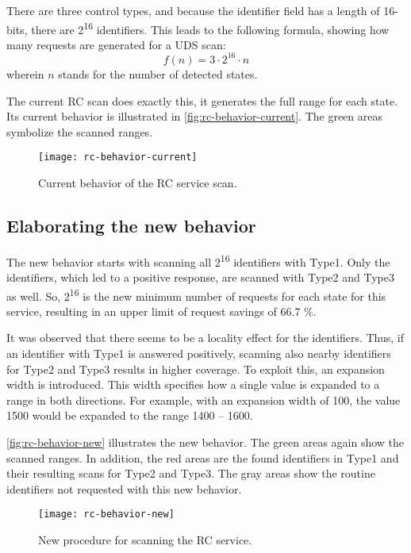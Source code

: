 There are three control types, and because the identifier field has a length of 16-bits, there are 2\textsuperscript{16} identifiers. This leads to the following formula, showing how many requests are generated for a UDS scan:
\[f(n)=3 \cdot 2^{16} \cdot n\]
wherein $n$ stands for the number of detected states.

The current RC scan does exactly this, it generates the full range for each state. Its current behavior is illustrated in \autoref{fig:rc-behavior-current}. The green areas symbolize the scanned ranges.

\begin{figure}[htb]
    \centering
    \texttt{[image: rc-behavior-current]}
    \caption{Current behavior of the RC service scan.}
    \label{fig:rc-behavior-current}
\end{figure}

\subsection{Elaborating the new behavior}
\label{subsubsec:rc-elaborating}

The new behavior starts with scanning all 2\textsuperscript{16} identifiers with Type1. Only the identifiers, which led to a positive response, are scanned with Type2 and Type3 as well. So, 2\textsuperscript{16} is the new minimum number of requests for each state for this service, resulting in an upper limit of request savings of 66.7 \%.

It was observed that there seems to be a locality effect for the identifiers. Thus, if an identifier with Type1 is answered positively, scanning also nearby identifiers for Type2 and Type3 results in higher coverage. To exploit this, an expansion width is introduced. This width specifies how a single value is expanded to a range in both directions. For example, with an expansion width of 100, the value 1500 would be expanded to the range 1400 – 1600.

\autoref{fig:rc-behavior-new} illustrates the new behavior. The green areas again show the scanned ranges. In addition, the red areas are the found identifiers in Type1 and their resulting scans for Type2 and Type3. The gray areas show the routine identifiers not requested with this new behavior.

\begin{figure}[htb]
    \centering
    \texttt{[image: rc-behavior-new]}
    \caption{New procedure for scanning the RC service.}
    \label{fig:rc-behavior-new}
\end{figure}

